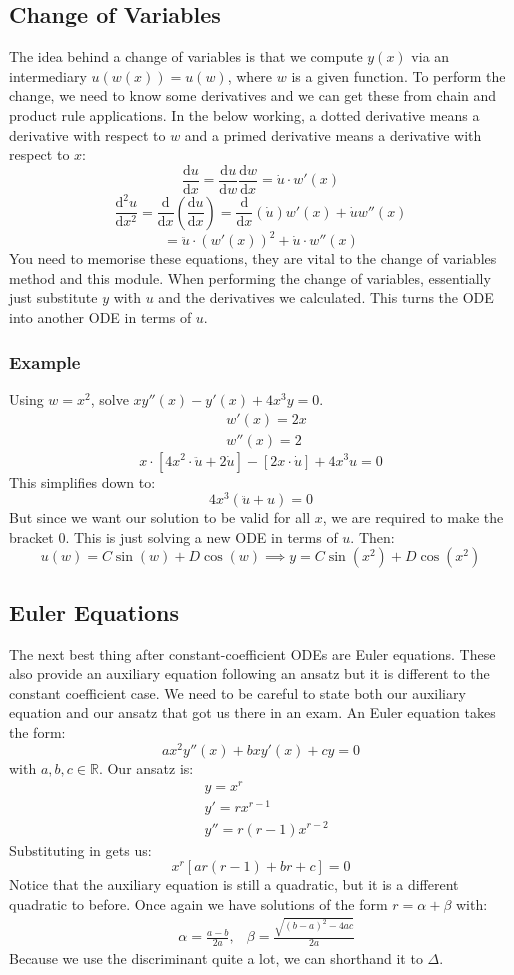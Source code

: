 \documentclass[12pt]{article}
\newcommand{\df}[2]{\frac{\text{d}#1}{\text{d}#2}}
\begin{document}
\subsection{Change of Variables}
The idea behind a change of variables is that we compute \(y(x)\) via an intermediary \(u(w(x))=u(w)\), where \(w\) is a given function. To perform the change, we need to know some derivatives and we can get these from chain and product rule applications. In the below working, a dotted derivative means a derivative with respect to \(w\) and a primed derivative means a derivative with respect to \(x\):
\[\df{u}{x}=\df{u}{w}\df{w}{x}=\dot{u}\cdot w'(x)\]
\[\df{^2u}{x^2}=\df{}{x}\left(\df{u}{x}\right)=\df{}{x}(\dot{u})w'(x)+\dot{u}w''(x)\]
\[=\ddot{u}\cdot (w'(x))^2+\dot{u}\cdot w''(x)\]
You need to memorise these equations, they are vital to the change of variables method and this module. When performing the change of variables, essentially just substitute \(y\) with \(u\) and the derivatives we calculated. This turns the ODE into another ODE in terms of \(u\).
\subsubsection*{Example}
Using \(w=x^2\), solve \(xy''(x)-y'(x)+4x^3y=0\).
\begin{align*}
    &w'(x)=2x \\
    &w''(x)=2
\end{align*}
\[x\cdot[4x^2\cdot\ddot{u}+2\dot{u}]-[2x\cdot\dot{u}]+4x^3u=0\]
This simplifies down to:
\[4x^3(\ddot{u}+u)=0\]
But since we want our solution to be valid for all \(x\), we are required to make the bracket \(0\). This is just solving a new ODE in terms of \(u\). Then:
\[u(w)=C\sin(w)+D\cos(w)\implies y=C\sin(x^2)+D\cos(x^2)\]
\subsection{Euler Equations}
The next best thing after constant-coefficient ODEs are Euler equations. These also provide an auxiliary equation following an ansatz but it is different to the constant coefficient case. We need to be careful to state both our auxiliary equation and our ansatz that got us there in an exam. An Euler equation takes the form:
\[ax^2y''(x)+bxy'(x)+cy=0\]
with \(a,b,c\in\mathbb{R}\). Our ansatz is:
\begin{align*}
    &y=x^r \\
    &y'=rx^{r-1} \\
    &y''=r(r-1)x^{r-2}
\end{align*}
Substituting in gets us:
\[x^r[ar(r-1)+br+c]=0\]
Notice that the auxiliary equation is still a quadratic, but it is a different quadratic to before. Once again we have solutions of the form \(r=\alpha+\beta\) with:
\begin{align*}
    &\alpha=\frac{a-b}{2a}, & \beta=\frac{\sqrt{(b-a)^2-4ac}}{2a}
\end{align*}
Because we use the discriminant quite a lot, we can shorthand it to \(\Delta\).
\end{document}
